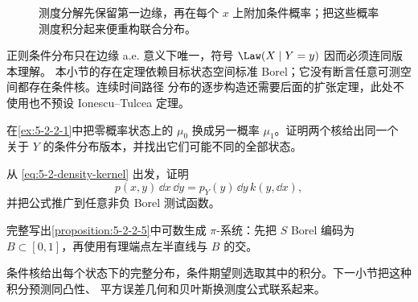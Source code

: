 \begin{figure}[htbp]
\centering
{}
\caption{测度分解先保留第一边缘，再在每个 $x$ 上附加条件概率；把这些概率测度积分起来便重构联合分布。}
\label{fig:5-2-2-disintegration-clouds}
\end{figure}

正则条件分布只在边缘 a.e. 意义下唯一，符号 $\Law(X\mid Y=y)$ 因而必须连同版本理解。
本小节的存在定理依赖目标状态空间标准 Borel；它没有断言任意可测空间都存在条件核。连续时间路径
分布的逐步构造还需要后面的扩张定理，此处不使用也不预设 Ionescu--Tulcea 定理。

\begin{exercise}[离散核的零概率行]
在\cref{ex:5-2-2-1}中把零概率状态上的 $\mu_0$ 换成另一概率 $\mu_1$。证明两个核给出同一个
关于 $Y$ 的条件分布版本，并找出它们可能不同的全部状态。
\end{exercise}

\begin{exercise}[密度模型的测度分解]
从 \eqref{eq:5-2-density-kernel} 出发，证明
\[
 p(x,y)\,\dd x\,\dd y
 =p_Y(y)\,\dd y\,k(y,\dd x),
\]
并把公式推广到任意非负 Borel 测试函数。
\end{exercise}

\begin{exercise}[核的共同零集]
完整写出\cref{proposition:5-2-2-5}中可数生成 $\pi$-系统：先把 $S$ Borel 编码为
$B\subset[0,1]$，再使用有理端点左半直线与 $B$ 的交。
\end{exercise}

条件核给出每个状态下的完整分布，条件期望则选取其中的积分。下一小节把这种积分预测同凸性、
平方误差几何和贝叶斯换测度公式联系起来。


